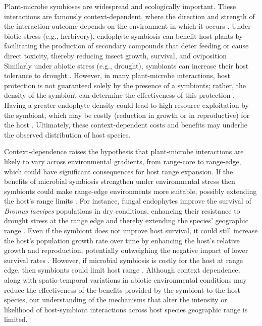 \documentclass[11pt]{article}
\begin{document}
Plant-microbe symbioses are widespread and ecologically important. 
These interactions are famously context-dependent, where the direction and strength of the interaction outcome depends on the environment in which it occurs \citep{fowler2023geographic,hoeksema2015context, bronstein1994conditional}.
Under biotic stress (e.g., herbivory), endophyte symbiosis can benefit host plants by facilitating the production of secondary compounds that deter feeding or cause direct toxicity, thereby reducing insect growth, survival, and oviposition \citep{atala2022fungal,bastias2017epichloe,vega2008insect}.
Similarly under abiotic stress (e.g., drought), symbionts can increase their host tolerance to drought \citep{clay2002evolutionary}.
However, in many plant-microbe interactions, host protection is not guaranteed solely by the presence of a symbionts; rather, the density of the symbiont can determine the effectiveness of this protection \citep{laughton2014combined}. 
Having a greater endophyte density could lead to high resource exploitation by the symbiont, which may be costly (reduction in  growth  or in reproductive) for the host \citep{faeth2009asexual}.
Ultimately, these context-dependent costs and benefits may underlie the observed distribution of host species.

Context-dependence raises the hypothesis that plant-microbe interactions are likely to vary across environmental gradients, from range-core to range-edge, which could have significant consequences for host range expansion.
If the benefits of microbial symbiosis strengthen under environmental stress then symbionts could make range-edge environments more suitable, possibly extending the host’s range limits \citep{allsup2023shifting,rudgers2020climate}.
For instance, fungal endophytes improve the survival of \emph{Bromus laevipes} populations in dry conditions, enhancing their resistance to drought stress at the range edge and thereby extending the species' geographic range \citep{david2019soil,afkhami2014mutualist}.
Even if the symbiont does not improve host survival, it could still increase the host's population growth rate over time by enhancing the host's relative growth and reproduction, potentially outweighing the negative impact of lower survival rates \citep{yule2013costs}.
However, if microbial symbiosis is costly for the host at range edge, then symbionts could limit host range \citep{benning2021microbes,benning2021plant,bennett2022costs}.
Although context dependence, along with spatio-temporal variations in abiotic environmental conditions may reduce the effectiveness of the benefits provided by the symbiont to the host species, our understanding of the mechanisms that alter the intensity or likelihood of host-symbiont interactions across host species geographic range is limited.
\end{document}
